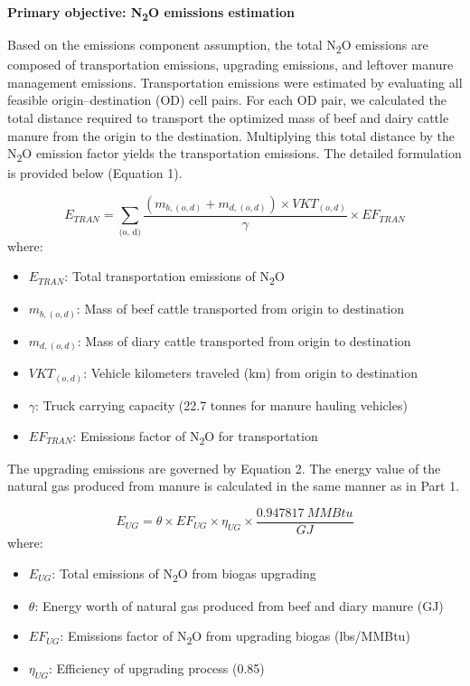 \documentclass[12pt]{article}
\begin{document}
\textbf{Primary objective: N\textsubscript{2}O emissions estimation}

Based on the emissions component assumption, the total N\textsubscript{2}O emissions are composed of transportation emissions, upgrading emissions, and leftover manure management emissions. Transportation emissions were estimated by evaluating all feasible origin–destination (OD) cell pairs. For each OD pair, we calculated the total distance required to transport the optimized mass of beef and dairy cattle manure from the origin to the destination. Multiplying this total distance by the N\textsubscript{2}O emission factor yields the transportation emissions. The detailed formulation is provided below (Equation 1).

\begin{equation}
  E_{TRAN} = \sum_{\text{(o, d)}}\frac{(m_{b, (o, d)} + m_{d, (o, d)}) \times VKT_{(o, d)}}{\gamma} \times EF_{TRAN}
\end{equation}
where:
\begin{itemize}
  \item $E_{TRAN}$: Total transportation emissions of N\textsubscript{2}O
  \item $m_{b, (o, d)}$: Mass of beef cattle transported from origin to destination
  \item $m_{d, (o, d)}$: Mass of diary cattle transported from origin to destination
  \item $VKT_{(o, d)}$: Vehicle kilometers traveled (km) from origin to destination
  \item $\gamma$: Truck carrying capacity (22.7 tonnes for manure hauling vehicles)
  \item $EF_{TRAN}$: Emissions factor of N\textsubscript{2}O for transportation
\end{itemize}

The upgrading emissions are governed by Equation 2. The energy value of the natural gas produced from manure is calculated in the same manner as in Part 1.

\begin{equation}
  E_{UG} = \theta \times EF_{UG} \times \eta_{UG} \times \frac{0.947817 \ MMBtu}{GJ}
\end{equation}
where:
\begin{itemize}
  \item $E_{UG}$: Total emissions of N\textsubscript{2}O from biogas upgrading
  \item $\theta$: Energy worth of natural gas produced from beef and diary manure (GJ)
  \item $EF_{UG}$: Emissions factor of N\textsubscript{2}O from upgrading biogas (lbs/MMBtu)
  \item $\eta_{UG}$: Efficiency of upgrading process (0.85)
\end{itemize}
\end{document}
